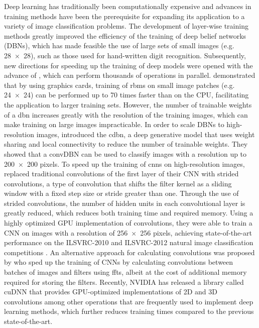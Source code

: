 Deep learning has traditionally been computationally expensive and advances in
training methods have been the prerequisite for expanding its application to a
variety of image classification problems. The development of layer-wise training
methods \citep{hinton2006b} greatly improved the efficiency of the training of
deep belief networks (DBNs), which has made feasible the use of large sets of
small images (e.g. \num{28x28}), such as those used for hand-written digit
recognition. Subsequently, new directions for speeding up the training of deep
models were opened with the advance of , which can perform thousands of operations in parallel.
\citet{raina2009} demonstrated that by using graphics cards, training of
\glspl{rbm} on small image patches (e.g. \num{24x24}) can be performed up to
\num{70} times faster than on the CPU, facilitating the application to larger
training sets. However, the number of trainable weights of a \gls{dbn} increases
greatly with the resolution of the training images, which can make training on
large images impracticable. In order to scale DBNs to high-resolution images,
\citet{lee2009,lee2011} introduced the \gls{cdbn}, a deep generative model that
uses weight sharing and local connectivity to reduce the number of trainable
weights. They showed that a convDBN can be used to classify images with a
resolution up to \num{200x200} pixels. To speed up the training of \glspl{cnn}
on high-resolution images, \citet{krizhevsky2012} replaced traditional
convolutions of the first layer of their CNN with strided convolutions, a type
of convolution that shifts the filter kernel as a sliding window with a fixed
step size or stride greater than one. Through the use of strided convolutions,
the number of hidden units in each convolutional layer is greatly reduced, which
reduces both training time and required memory. Using a highly optimized GPU
implementation of convolutions, they were able to train a CNN on images with a
resolution of \num{256x256} pixels, achieving state-of-the-art performance on
the ILSVRC-2010 and ILSVRC-2012 natural image classification competitions
\citep{krizhevsky2012}. An alternative approach for calculating convolutions was
proposed by \citet{mathieu2013} who sped up the training of CNNs by calculating
convolutions between batches of images and filters using \glspl{fft}, albeit at
the cost of additional memory required for storing the filters. Recently, NVIDIA
has released a library called cuDNN \citep{chetlur2014} that provides
GPU-optimized implementations of 2D and 3D convolutions among other operations
that are frequently used to implement deep learning methods, which further
reduces training times compared to the previous state-of-the-art.

